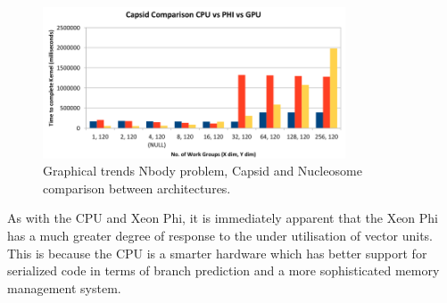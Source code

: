 \begin{figure}[!h]
    \centering
    \includegraphics[width=0.8\textwidth]{figures/nbody_comp.png}
    \caption{Graphical trends Nbody problem, Capsid and Nucleosome comparison between architectures.}
    \label{nbody_comp}
\end{figure}

\par{As with the CPU and Xeon Phi, it is immediately apparent 
    that the Xeon Phi has a much greater degree of response to 
    the under utilisation of vector units. This is because the CPU 
    is a smarter hardware which has better support for serialized 
    code in terms of branch prediction and a more sophisticated memory 
    management system.}


